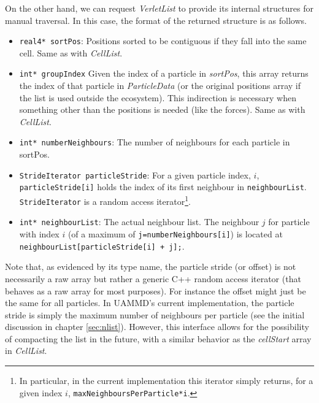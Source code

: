 \documentclass[twoside,openright,titlepage,numbers=noenddot,%
headinclude,footinclude,cleardoublepage=empty,abstract=on,
BCOR=5mm,fontsize=11pt, dvipsnames, paper=b5
]{scrreprt}
\def\ucpp{uammd_cpp_lexer.py:UAMMDCppLexer -x}
\newcommand{\uammd}{\gls{UAMMD}\xspace}
\begin{document}
On the other hand, we can request \emph{VerletList} to provide its internal structures for manual traversal. In this case, the format of the returned structure is as follows.
\begin{itemize}
\item\texttt{real4* sortPos}:
  Positions sorted to be contiguous if they fall into the same cell. Same as with \emph{CellList}.
\item\texttt{int* groupIndex}
  Given the index of a particle in \emph{sortPos}, this array returns the index of that particle in \emph{ParticleData} (or the original positions array if the list is used outside the ecosystem).
  This indirection is necessary when something other than the positions is needed (like the forces). Same as with \emph{CellList}.
\item\texttt{int* numberNeighbours}:
  The number of neighbours for each particle in sortPos.
\item\texttt{StrideIterator particleStride}:
  For a given particle index, $i$, \texttt{particleStride[i]} holds the index of its first neighbour in \texttt{neighbourList}. \texttt{StrideIterator} is a random access iterator\footnote{In particular, in the current implementation this iterator simply returns, for a given index $i$, \texttt{maxNeighboursPerParticle*i}.}.
\item\texttt{int* neighbourList}:
  The actual neighbour list. The neighbour $j$ for particle with index $i$ (of a maximum of \texttt{j=numberNeighbours[i]}) is located at \texttt{neighbourList[particleStride[i] + j];}.
\end{itemize}

Note that, as evidenced by its type name, the particle stride (or offset) is not necessarily a raw array but rather a generic C++ random access iterator (that behaves as a raw array for most purposes). For instance the offset might just be the same for all particles. In \uammd's current implementation, the particle stride is simply the maximum number of neighbours per particle (see the initial discussion in chapter \ref{sec:nlist}). However, this interface allows for the possibility of compacting the list in the future, with a similar behavior as the \emph{cellStart} array in \emph{CellList}.
\end{document}
